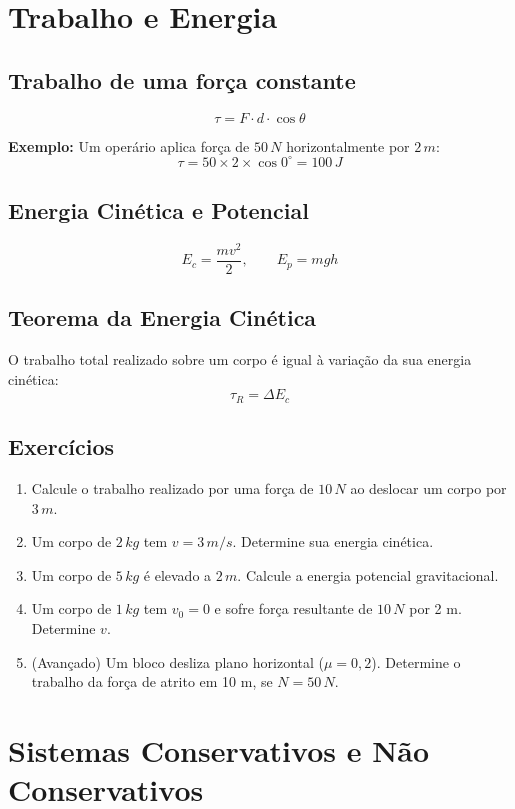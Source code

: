 \documentclass[12pt,a4paper]{article}
\begin{document}
\section{Trabalho e Energia}

\subsection{Trabalho de uma força constante}
\[
\tau = F \cdot d \cdot \cos\theta
\]

\textbf{Exemplo:} Um operário aplica força de $50\,N$ horizontalmente por $2\,m$:
\[
\tau = 50 \times 2 \times \cos0^\circ = 100\,J
\]

\subsection{Energia Cinética e Potencial}
\[
E_c = \frac{mv^2}{2}, \qquad E_p = mgh
\]

\subsection{Teorema da Energia Cinética}
O trabalho total realizado sobre um corpo é igual à variação da sua energia cinética:
\[
\tau_R = \Delta E_c
\]

\subsection{Exercícios}
\begin{enumerate}
\item Calcule o trabalho realizado por uma força de $10\,N$ ao deslocar um corpo por $3\,m$.
\item Um corpo de $2\,kg$ tem $v=3\,m/s$. Determine sua energia cinética.
\item Um corpo de $5\,kg$ é elevado a $2\,m$. Calcule a energia potencial gravitacional.
\item Um corpo de $1\,kg$ tem $v_0=0$ e sofre força resultante de $10\,N$ por 2 m. Determine $v$.
\item (Avançado) Um bloco desliza plano horizontal ($\mu=0{,}2$). Determine o trabalho da força de atrito em 10 m, se $N=50\,N$.
\end{enumerate}

\section{Sistemas Conservativos e Não Conservativos}
\end{document}
